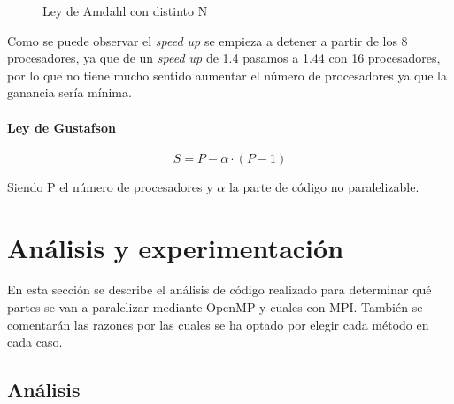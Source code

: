 \documentclass[12pt]{report} %
\begin{document}
\begin{figure}[H]
    \caption{Ley de Amdahl con distinto N}
    \label{fig:fig_amdahl}
\end{figure}

Como se puede observar el \textit{speed up} se empieza a detener a partir de los 8 procesadores, ya que
de un \textit{speed up} de 1.4 pasamos a 1.44 con 16 procesadores, por lo que no tiene mucho sentido
aumentar el número de procesadores ya que la ganancia sería mínima.

\subsubsection{Ley de Gustafson}
\label{sec:Gustafson}

\[ S = P - \alpha \cdot (P - 1)\]

Siendo P el número de procesadores y $\alpha$ la parte de código no paralelizable.


\chapter{Análisis y experimentación}

En esta sección se describe el análisis de código realizado para determinar qué partes se van a
paralelizar mediante OpenMP y cuales con MPI. También se comentarán las razones por las cuales se ha optado
por elegir cada método en cada caso.

\section{Análisis}
\end{document}
